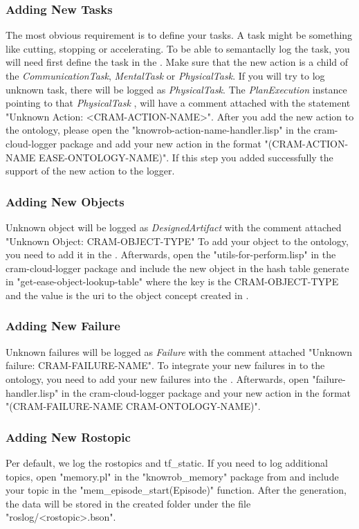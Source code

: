\subsubsection{Adding New Tasks}
The most obvious requirement is to define your tasks.
A task might be something like cutting, stopping or accelerating.
To be able to semantaclly log the task, you will need first define the task in the \easeAct.
Make sure that the new action is a child of the \textit{CommunicationTask}, \textit{MentalTask} or \textit{PhysicalTask}.
If you will try to log unknown task, there will be logged as \textit{PhysicalTask}.
The \textit{PlanExecution} instance pointing to that \textit{PhysicalTask} , will have a comment attached with the statement "Unknown Action: <CRAM-ACTION-NAME>".
After you add the new action to the ontology, please open the "knowrob-action-name-handler.lisp" in the cram-cloud-logger package and add your new action in the format "(CRAM-ACTION-NAME EASE-ONTOLOGY-NAME)".
If this step you added successfully the support of the new action to the logger.

\subsubsection{Adding New Objects}
Unknown object will be logged as \textit{DesignedArtifact} with the comment attached "Unknown Object: CRAM-OBJECT-TYPE"
To add your object to the ontology, you need to add it in the \easeObj.
Afterwards, open the "utils-for-perform.lisp" in the 
cram-cloud-logger package and include the new object in the hash table generate in "get-ease-object-lookup-table" where the key is the CRAM-OBJECT-TYPE and the value is the uri to the object concept created in \easeObj.

\subsubsection{Adding New Failure}
Unknown failures will be logged as \textit{Failure} with the comment attached "Unknown failure: CRAM-FAILURE-NAME".
To integrate your new \cram failures in to the ontology, you need to add your new failures into the \cramOwl.
Afterwards, open "failure-handler.lisp" in the cram-cloud-logger package and your new action in the format "(CRAM-FAILURE-NAME CRAM-ONTOLOGY-NAME)".	

\subsubsection{Adding New Rostopic}
Per default, we log the rostopics \tf and tf\_static.
If you need to log additional topics, open "memory.pl" in the "knowrob\_memory" package from \knowrob and include your topic in the "mem\_episode\_start(Episode)" function.
After the \neem generation, the data will be stored in the created \neem folder under the file "roslog/<rostopic>.bson".

